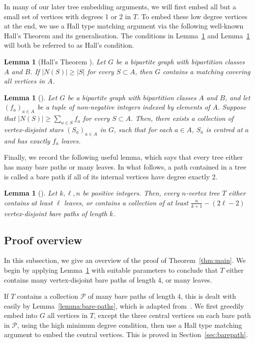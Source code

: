 \documentclass{article}
\theoremstyle{plain}
\newtheorem{lemma}[theorem]{Lemma}
\theoremstyle{definition}
\numberwithin{equation}{section}
\begin{document}
In many of our later tree embedding arguments, we will first embed all but a small set of vertices with degrees 1 or 2 in $T$. To embed these low degree vertices at the end, we use a Hall type matching argument via the following well-known Hall's Theorem and its generalisation. The conditions in Lemma~\ref{lemma:Hall} and Lemma~\ref{lemma:hallmatching} will both be referred to as Hall's condition.
\begin{lemma}[Hall's Theorem {\cite[Theorem 1]{H}}]\label{lemma:Hall}
Let $G$ be a bipartite graph with bipartition classes $A$ and $B$. If $|N(S)|\ge |S|$ for every $S\subset A$, then $G$ contains a matching covering all vertices in $A$.
\end{lemma}
\begin{lemma}[{\cite[Corollary 11]{B}}]\label{lemma:hallmatching}
Let $G$ be a bipartite graph with bipartition classes $A$ and $B$, and let $(f_a)_{a\in A}$ be a tuple of non-negative integers indexed by elements of $A$. Suppose that $|N(S)|\geq\sum_{a\in S}f_a$ for every $S\subset A$. Then, there exists a collection of vertex-disjoint stars $(S_a)_{a\in A}$ in $G$, such that for each $a\in A$, $S_a$ is centred at $a$ and has exactly $f_a$ leaves.
\end{lemma}

Finally, we record the following useful lemma, which says that every tree either has many bare paths or many leaves. In what follows, a path contained in a tree is called a bare path if all of its internal vertices have degree exactly 2. 
\begin{lemma}[{\cite[Lemma 2.1]{K}}]\label{lemma:paths-leaf}
Let $k,\ell, n$ be positive integers. Then, every $n$-vertex tree $T$ either contains at least $\ell$ leaves, or contains a collection of at least $\frac{n}{k+1}-(2\ell-2)$ vertex-disjoint bare paths of length $k$.
\end{lemma}


\subsection{Proof overview}\label{sec:outline}
In this subsection, we give an overview of the proof of Theorem~\ref{thm:main}. We begin by applying Lemma~\ref{lemma:paths-leaf} with suitable parameters to conclude that $T$ either contains many vertex-disjoint bare paths of length 4, or many leaves. 

If $T$ contains a collection $\mathcal{P}$ of many bare paths of length 4, this is dealt with easily by Lemma~\ref{lemma:bare-paths}, which is adapted from{~\cite[Lemma 6.1]{MPY}}. We first greedily embed into $G$ all vertices in $T$, except the three central vertices on each bare path in $\mathcal{P}$, using the high minimum degree condition, then use a Hall type matching argument to embed the central vertices. This is proved in Section~\ref{sec:barepath}. 
\end{document}
